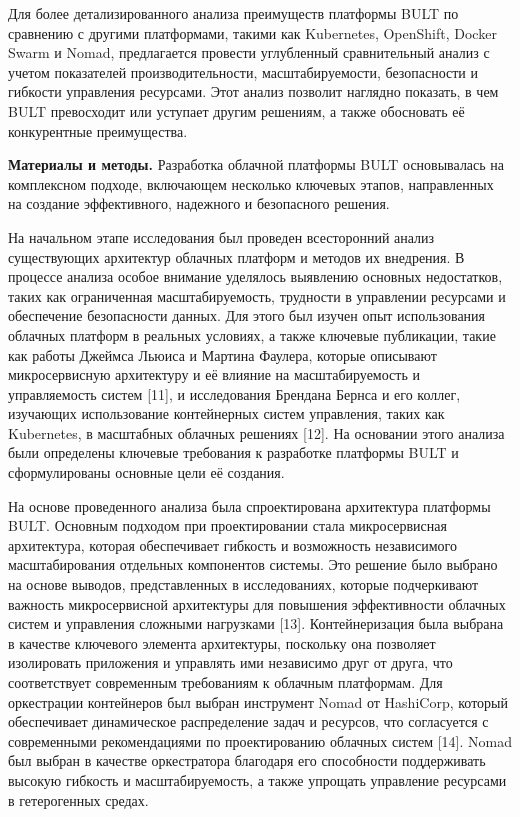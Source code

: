 \begin{multicols}{2}
Для более детализированного анализа преимуществ платформы BULT по
сравнению с другими платформами, такими как Kubernetes, OpenShift,
Docker Swarm и Nomad, предлагается провести углубленный сравнительный
анализ с учетом показателей производительности, масштабируемости,
безопасности и гибкости управления ресурсами. Этот анализ позволит
наглядно показать, в чем BULT превосходит или уступает другим решениям,
а также обосновать её конкурентные преимущества.

{\bfseries Материалы и методы.} Разработка облачной платформы BULT
основывалась на комплексном подходе, включающем несколько ключевых
этапов, направленных на создание эффективного, надежного и безопасного
решения.

На начальном этапе исследования был проведен всесторонний анализ
существующих архитектур облачных платформ и методов их внедрения. В
процессе анализа особое внимание уделялось выявлению основных
недостатков, таких как ограниченная масштабируемость, трудности в
управлении ресурсами и обеспечение безопасности данных. Для этого был
изучен опыт использования облачных платформ в реальных условиях, а также
ключевые публикации, такие как работы Джеймса Льюиса и Мартина Фаулера,
которые описывают микросервисную архитектуру и её влияние на
масштабируемость и управляемость систем {[}11{]}, и исследования
Брендана Бернса и его коллег, изучающих использование контейнерных
систем управления, таких как Kubernetes, в масштабных облачных решениях
{[}12{]}. На основании этого анализа были определены ключевые требования
к разработке платформы BULT и сформулированы основные цели её создания.

На основе проведенного анализа была спроектирована архитектура платформы
BULT. Основным подходом при проектировании стала микросервисная
архитектура, которая обеспечивает гибкость и возможность независимого
масштабирования отдельных компонентов системы. Это решение было выбрано
на основе выводов, представленных в исследованиях, которые подчеркивают
важность микросервисной архитектуры для повышения эффективности облачных
систем и управления сложными нагрузками {[}13{]}. Контейнеризация была
выбрана в качестве ключевого элемента архитектуры, поскольку она
позволяет изолировать приложения и управлять ими независимо друг от
друга, что соответствует современным требованиям к облачным платформам.
Для оркестрации контейнеров был выбран инструмент Nomad от HashiCorp,
который обеспечивает динамическое распределение задач и ресурсов, что
согласуется с современными рекомендациями по проектированию облачных
систем {[}14{]}. Nomad был выбран в качестве оркестратора благодаря его
способности поддерживать высокую гибкость и масштабируемость, а также
упрощать управление ресурсами в гетерогенных средах.


\end{multicols}

